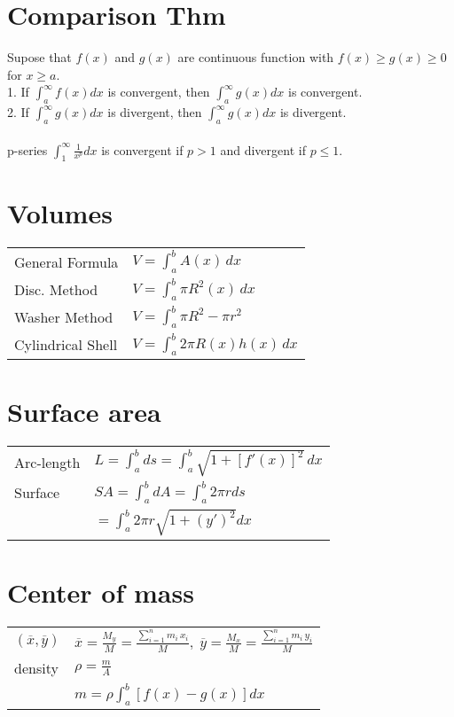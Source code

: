 \documentclass[5pt]{article}
\begin{document}
\begin{multicols}{2}
\section{Comparison Thm}
Supose that $f(x)$ and $g(x)$ are continuous function with $f(x)\geq g(x)\geq0$ for $x\geq a$.\\
1. If $\int^\infty_af(x)dx$ is  convergent, then $\int^\infty_ag(x)dx$ is convergent.\\
2. If $\int^\infty_ag(x)dx$ is  divergent, then $\int^\infty_ag(x)dx$ is divergent.\\
\\
p-series $\int^\infty_1\frac{1}{x^p}dx$ is convergent if $p>1$ and divergent if $p\le 1$.\\

\section{Volumes}
\begin{tabular}{ll}
    General Formula & $V=\int_a^bA(x)\,dx$\\
    Disc. Method & $V=\int_a^b\pi R^2(x)\,dx$\\
    Washer Method & $V=\int_a^b\pi R^2-\pi r^2$\\
    Cylindrical Shell & $V=\int_a^b2\pi R(x)h(x)\,dx$\\
\end{tabular}
\section{Surface area}
\begin{tabular}{ll}
    Arc-length & $L=\int_a^bds=\int_a^b\sqrt{1+[f'(x)]^2}\, dx$ \\
    Surface    & $SA=\int_a^bdA=\int_a^b2\pi r ds$\\
               & $=\int_a^b2\pi r \sqrt{1+(y')^2}dx$\\
\end{tabular}
\section{Center of mass}
\begin{tabular}{ll}
    $(\overline{x}, \overline{y})$ & $\overline{x}=\frac{M_y}{M}=\frac{\sum^n_{i=1}m_i\,x_i}{M},\;\overline{y}=\frac{M_x}{M}=\frac{\sum^n_{i=1}m_i\,y_i}{M}$ \\
    density & $\rho=\frac{m}{A}$\\
    & $m=\rho\int^b_a[f(x)-g(x)]dx$
    

\end{tabular}
\end{multicols}
\end{document}
